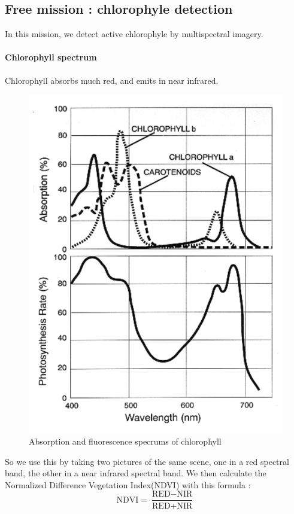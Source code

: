 \documentclass[twocolumn,10pt]{article}
\begin{document}
    \subsection{Free mission : chlorophyle detection}%
        \par In this mission, we detect active chlorophyle by multispectral imagery.
        \paragraph*{Chlorophyll spectrum} Chlorophyll absorbs much red, and emits in near infrared.
        \begin{figure}[!h]
        \includegraphics[scale=.4]{Par_action_spectrum.png}
        \caption{Absorption and fluorescence specrums of chlorophyll}
        \end{figure}
        \par So we use this by taking two pictures of the same scene, one in a red spectral band, the other in a near infrared spectral band. We then calculate the Normalized Difference Vegetation Index(NDVI) with this formula :
         \[ \textrm{NDVI} = \frac{\textrm{RED}-\textrm{NIR}}{\textrm{RED}+\textrm{NIR}} \]
\end{document}
